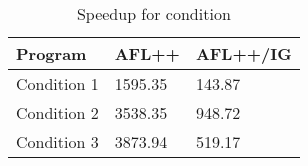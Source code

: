 \begin{table}
\caption{Speedup for condition}
\label{tab:condition_speedup}
\begin{tabular}{lll}
\toprule
Program & AFL++ & AFL++/IG \\
\midrule
Condition 1 & 1595.35 & 143.87 \\
Condition 2 & 3538.35 & 948.72 \\
Condition 3 & 3873.94 & 519.17 \\
\bottomrule
\end{tabular}
\end{table}
